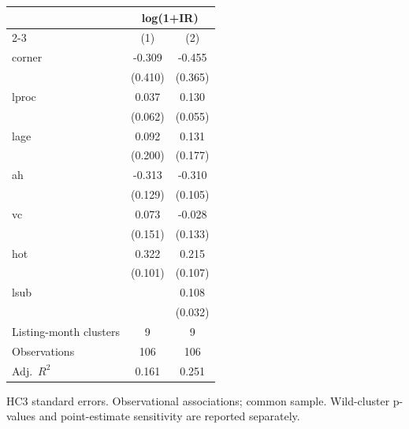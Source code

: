 \begin{table}[!htbp]\centering
\begin{tabular}{lcc}
\toprule
 & \multicolumn{2}{c}{log(1+IR)} \\
\cmidrule(lr){2-3}
 & (1) & (2) \\
\midrule
corner & -0.309 & -0.455 \\
 & (0.410) & (0.365) \\
lproc & 0.037 & 0.130 \\
 & (0.062) & (0.055) \\
lage & 0.092 & 0.131 \\
 & (0.200) & (0.177) \\
ah & -0.313 & -0.310 \\
 & (0.129) & (0.105) \\
vc & 0.073 & -0.028 \\
 & (0.151) & (0.133) \\
hot & 0.322 & 0.215 \\
 & (0.101) & (0.107) \\
lsub &  & 0.108 \\
 &  & (0.032) \\
\midrule
Listing-month clusters & 9 & 9 \\
Observations & 106 & 106 \\
Adj.\ $R^2$ & 0.161 & 0.251 \\
\bottomrule
\end{tabular}
\par\vspace{2pt}\begin{minipage}{0.95\linewidth}\footnotesize HC3 standard errors. Observational associations; common sample. Wild-cluster p-values and point-estimate sensitivity are reported separately.\end{minipage}
\end{table}